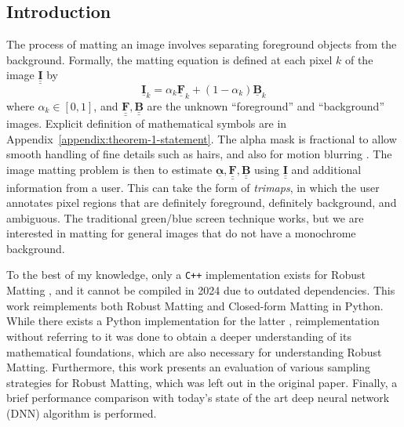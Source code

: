 \documentclass{article}
\def\vt#1{\underline{\mathbf{#1}}}
\def\vts#1{\underline{\boldsymbol{#1}}}
\def\mt#1{\underline{\underline{\mathbf{#1}}}}
\begin{document}
\begin{multicols}{2}[]




\section{Introduction}


The process of matting an image involves separating foreground objects from the background. Formally, the matting equation is defined at each pixel $k$ of the image $\mt I$ by $$\vt I_k = \alpha_{k} \vt F_{k}  + (1-\alpha_k) \vt B_k$$
where $\alpha_{k}\in[0,1]$, and $\mt F, \mt B$ are the unknown ``foreground'' and ``background'' images. Explicit definition of mathematical symbols are in Appendix~\ref{appendix:theorem-1-statement}.   The alpha mask is fractional to allow smooth handling of fine details such as hairs, and also for motion blurring \cite{bayesian-matting}. The image matting problem is then to estimate $\vts \alpha, \mt F, \mt B$ using $\mt I$ and additional information from a user. This can take the form of \emph{trimaps}, in which the user annotates pixel regions that are definitely foreground, definitely background, and ambiguous.  The traditional green/blue screen technique works, but we are interested in matting for general images that do not have a monochrome background.

To the best of my knowledge, only a \verb|C++| implementation \cite{web:robust-cpp-github} exists for Robust Matting \cite{robust-matting}, and it cannot be compiled in 2024 due to outdated dependencies.  This work reimplements both Robust Matting and Closed-form Matting \cite{closed-form-matting} in Python. While there exists a Python implementation for the latter \cite{web:closed-form-python-github}, reimplementation without referring to it was done to obtain a deeper understanding of its mathematical foundations, which are also necessary for understanding Robust Matting. Furthermore, this work presents an evaluation of various sampling strategies for Robust Matting, which was left out in the original paper. Finally, a brief performance comparison with today's state of the art deep neural network (DNN) algorithm is performed.





\end{multicols}
\end{document}
